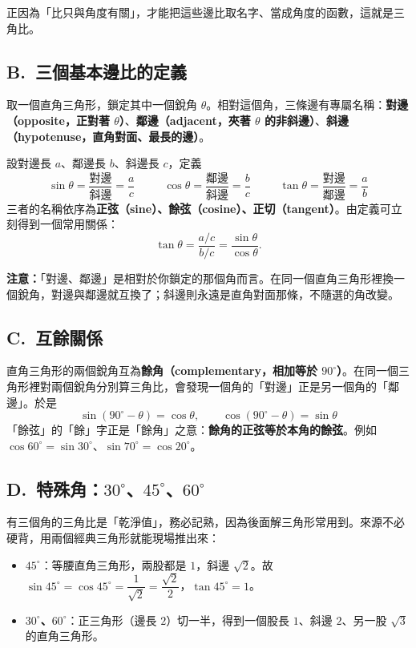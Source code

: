 \documentclass[11pt]{article}
\begin{document}
正因為「比只與角度有關」，才能把這些邊比取名字、當成角度的函數，這就是三角比。

\subsection*{\sffamily B.\ 三個基本邊比的定義}

取一個直角三角形，鎖定其中一個銳角 $\theta$。相對這個角，三條邊有專屬名稱：\textbf{對邊（opposite，正對著 $\theta$）}、\textbf{鄰邊（adjacent，夾著 $\theta$ 的非斜邊）}、\textbf{斜邊（hypotenuse，直角對面、最長的邊）}。


設對邊長 $a$、鄰邊長 $b$、斜邊長 $c$，定義
$$\boxed{\;\sin\theta=\frac{\text{對邊}}{\text{斜邊}}=\frac{a}{c}\;}\qquad\boxed{\;\cos\theta=\frac{\text{鄰邊}}{\text{斜邊}}=\frac{b}{c}\;}\qquad\boxed{\;\tan\theta=\frac{\text{對邊}}{\text{鄰邊}}=\frac{a}{b}\;}$$
三者的名稱依序為\textbf{正弦（sine）、餘弦（cosine）、正切（tangent）}。由定義可立刻得到一個常用關係：
$$\tan\theta=\frac{a/c}{b/c}=\frac{\sin\theta}{\cos\theta}.$$

\textbf{注意：}「對邊、鄰邊」是相對於你鎖定的那個角而言。在同一個直角三角形裡換一個銳角，對邊與鄰邊就互換了；斜邊則永遠是直角對面那條，不隨選的角改變。

\subsection*{\sffamily C.\ 互餘關係}

直角三角形的兩個銳角互為\textbf{餘角（complementary，相加等於 $90^\circ$）}。在同一個三角形裡對兩個銳角分別算三角比，會發現一個角的「對邊」正是另一個角的「鄰邊」。於是
$$\boxed{\;\sin(90^\circ-\theta)=\cos\theta,\qquad \cos(90^\circ-\theta)=\sin\theta\;}$$
「餘弦」的「餘」字正是「餘角」之意：\textbf{餘角的正弦等於本角的餘弦}。例如 $\cos 60^\circ=\sin 30^\circ$、$\sin 70^\circ=\cos 20^\circ$。

\subsection*{\sffamily D.\ 特殊角：$30^\circ$、$45^\circ$、$60^\circ$}

有三個角的三角比是「乾淨值」，務必記熟，因為後面解三角形常用到。來源不必硬背，用兩個經典三角形就能現場推出來：

\begin{itemize}\setlength{\itemsep}{2pt}
\item \textbf{$45^\circ$}：等腰直角三角形，兩股都是 $1$，斜邊 $\sqrt2$。故 $\sin 45^\circ=\cos 45^\circ=\dfrac{1}{\sqrt2}=\dfrac{\sqrt2}{2}$，$\tan 45^\circ=1$。
\item \textbf{$30^\circ$、$60^\circ$}：正三角形（邊長 $2$）切一半，得到一個股長 $1$、斜邊 $2$、另一股 $\sqrt3$ 的直角三角形。
\end{itemize}
\end{document}
